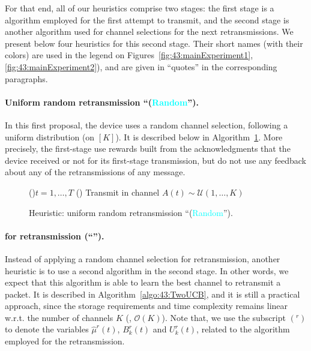 For that end, all of our heuristics comprise two stages:
the first stage is a \UCB{} algorithm employed for the first attempt to transmit,
and the second stage is another algorithm used for channel selections for the next retransmissions.
%
We present below four heuristics for this second stage.
Their short names (with their colors) are used in the legend on Figures~\ref{fig:43:mainExperiment1}, \ref{fig:43:mainExperiment2}), and are given in ``quotes'' in the corresponding paragraphs.


\paragraph{Uniform random retransmission ``(\textcolor{cyan}{Random}'').}\label{sub:43:UCBthenRandom}
%
In this first proposal, the device uses a random channel selection, following a uniform distribution (on $[K]$).
It is described below in Algorithm~\ref{algo:43:UCBthenRandom}.
More precisely, the first-stage \UCB{} use rewards built from the acknowledgments that the device received or not for its first-stage transmission, but do not use any feedback about any of the retransmissions of any message.

\begin{figure}[h!]
	\centering
    \begin{framed}
	\begin{algorithm}[H]
	\For(){$t = 1, \dots, T$}{
			\uElse(){
				Transmit in channel $A(t) \sim \mathcal{U}(1,\ldots,K)$\;
			}
		}
		\caption[Heuristic: uniform random retransmission.]{Heuristic: uniform random retransmission ``(\textcolor{cyan}{Random}'').}    %
		\label{algo:43:UCBthenRandom}
	\end{algorithm}
	\end{framed}
\end{figure}


\paragraph{\UCB{} for retransmission (``\textcolor{purple}{\UCB{}}'').}\label{sub:43:TwoUCB}
%
Instead of applying a random channel selection for retransmission,
another heuristic is to use a second \UCB{} algorithm in the second stage.
In other words, we expect that this algorithm is able to learn the best channel to retransmit a packet.
It is described in Algorithm~\ref{algo:43:TwoUCB}, and it is still a practical approach, since the storage requirements and time complexity remains linear w.r.t. the number of channels $K$ (\ie, $\mathcal{O}(K)$).
%
Note that, we use the subscript $({}^r)$ to denote the variables
$\widehat{\mu}^r(t)$, $B^r_k(t)$ and $U^r_k(t)$,
related to the \UCB{} algorithm employed for the retransmission.


